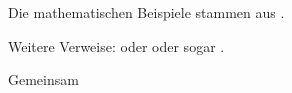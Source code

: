 \documentclass{article}
\begin{document}
Die mathematischen Beispiele stammen aus \autocite{Nightmind2001}.

Weitere Verweise: \parencite{Nightmind2001} oder \textcite{Clear2018} oder sogar
.

\autocite[56]{Clear2018}

\autocite[Siehe][45-48]{Nightmind2001}

Gemeinsam \autocite{Nightmind2001,Clear2018}

\printbibliography{}
\end{document}
